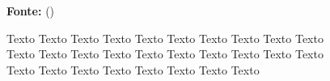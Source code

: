 \begin{figure}[ht!]
\centering

\caption{\textmd{Texto Texto Texto Texto Texto Texto Texto Texto Texto Texto Texto Texto Texto Texto Texto Texto Texto Texto Texto Texto Texto Texto Texto Texto Texto Texto Texto Texto}}
\label{fig:figuraex}

\par\medskip\ABNTEXfontereduzida\selectfont\textbf{Fonte:} \citeauthor{manualufpe2020} (\citeyear{manualufpe2020}) \par\medskip
\end{figure}